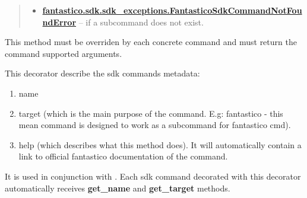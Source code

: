 \documentclass[letterpaper,10pt,english]{sphinxmanual}
\begin{document}
\begin{fulllineitems}
\begin{fulllineitems}
\begin{quote}
\begin{description}
\begin{itemize}
\item {} 
{\hyperref[features/sdk:fantastico.sdk.sdk_exceptions.FantasticoSdkCommandNotFoundError]{\textbf{fantastico.sdk.sdk\_exceptions.FantasticoSdkCommandNotFoundError}}} -- if a subcommand does not exist.

\end{itemize}

\end{description}\end{quote}

\end{fulllineitems}


\begin{fulllineitems}
\label{features/sdk:fantastico.sdk.sdk_core.SdkCommand.get_arguments}
This method must be overriden by each concrete command and must return the command supported arguments.

\end{fulllineitems}


\end{fulllineitems}


\begin{fulllineitems}
\label{features/sdk:fantastico.sdk.sdk_decorators.SdkCommand}
This decorator describe the sdk commands metadata:
\begin{enumerate}
\item {} 
name

\item {} 
target (which is the main purpose of the command. E.g: fantastico - this mean command is designed to work as a subcommand for fantastico cmd).

\item {} 
help (which describes what this method does). It will automatically contain a link to official fantastico documentation of the command.

\end{enumerate}

It is used in conjunction with {\hyperref[features/sdk:fantastico.sdk.sdk_core.SdkCommand]{}}. Each sdk command decorated with this
decorator automatically receives \textbf{get\_name} and \textbf{get\_target} methods.

\end{fulllineitems}
\end{document}
